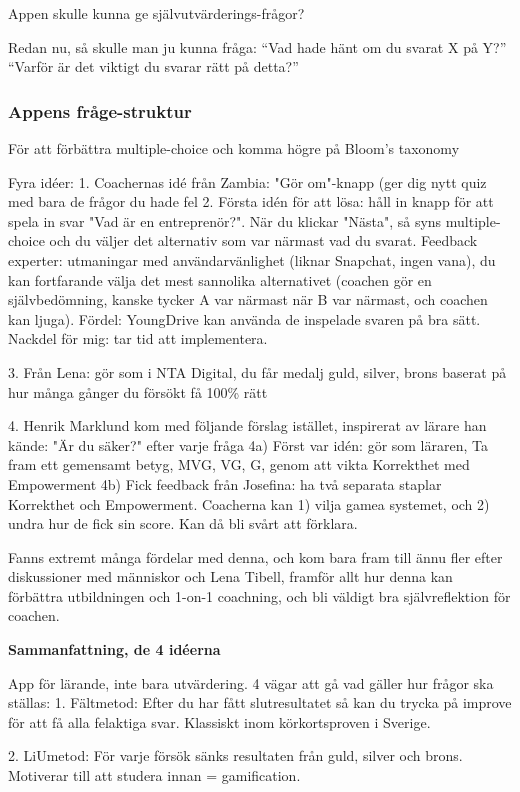 Appen skulle kunna ge självutvärderings-frågor?

Redan nu, så skulle man ju kunna fråga: “Vad hade hänt om du svarat X på Y?”
“Varför är det viktigt du svarar rätt på detta?”

\subsubsection{Appens fråge-struktur}

För att förbättra multiple-choice och komma högre på Bloom's taxonomy

Fyra idéer:
1. Coachernas idé från Zambia: "Gör om"-knapp (ger dig nytt quiz med bara de frågor du hade fel
2. Första idén för att lösa: håll in knapp för att spela in svar "Vad är en entreprenör?". När du klickar "Nästa", så syns multiple-choice och du väljer det alternativ som var närmast vad du svarat. Feedback experter: utmaningar med användarvänlighet (liknar Snapchat, ingen vana), du kan fortfarande välja det mest sannolika alternativet (coachen gör en självbedömning, kanske tycker A var närmast när B var närmast, och coachen kan ljuga). Fördel: YoungDrive kan använda de inspelade svaren på bra sätt. Nackdel för mig: tar tid att implementera.

3. Från Lena: gör som i NTA Digital, du får medalj guld, silver, brons baserat på hur många gånger du försökt få 100\% rätt

4. Henrik Marklund kom med följande förslag istället, inspirerat av lärare han kände: "Är du säker?" efter varje fråga
4a) Först var idén: gör som läraren, Ta fram ett gemensamt betyg, MVG, VG, G, genom att vikta Korrekthet med Empowerment
4b) Fick feedback från Josefina: ha två separata staplar Korrekthet och Empowerment. Coacherna kan 1) vilja gamea systemet, och 2) undra hur de fick sin score. Kan då bli svårt att förklara.

Fanns extremt många fördelar med denna, och kom bara fram till ännu fler efter diskussioner med människor och Lena Tibell, framför allt hur denna kan förbättra utbildningen och 1-on-1 coachning, och bli väldigt bra självreflektion för coachen.

\textbf{Sammanfattning, de 4 idéerna}

App för lärande, inte bara utvärdering.
4 vägar att gå vad gäller hur frågor ska ställas:
1. Fältmetod: Efter du har fått slutresultatet så kan du trycka på improve för att få alla felaktiga svar. Klassiskt inom körkortsproven i Sverige.

2. LiUmetod: För varje försök sänks resultaten från guld, silver och brons. Motiverar till att studera innan = gamification. 

